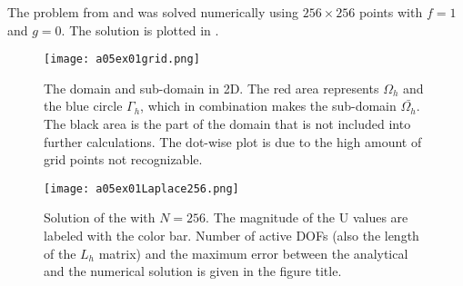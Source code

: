 %
The problem from  and  was solved numerically using $256 \times 256$ points with $f = 1$ and $g = 0$.
The solution is plotted in .
%
\vspace*{\FigUpperVSpace}
\begin{figure}[H]
	\centering
	\texttt{[image: a05ex01grid.png]} 
	\caption{The domain and sub-domain in 2D. The red area represents $\Omega_h$ and the blue circle $\Gamma_h$, which in combination makes the sub-domain $\bar{\Omega_h}$.
			 The black area is the part of the domain that is not included into further calculations.
			 The dot-wise plot is due to the high amount of grid points not recognizable.}
	\label{fig:a05ex01grid}
\end{figure}
%
\vspace*{\FigUpperVSpace}
%
\begin{figure}[H]
	\centering
	\texttt{[image: a05ex01Laplace256.png]} 
	\caption{Solution of the  with $N = 256$.
			 The magnitude of the U values are labeled with the color bar.
			 Number of active DOFs (also the length of the $L_h$ matrix) and the maximum error between the analytical and the numerical solution is given in the figure title.}
	\label{fig:a05ex01Laplace256}
\end{figure}

